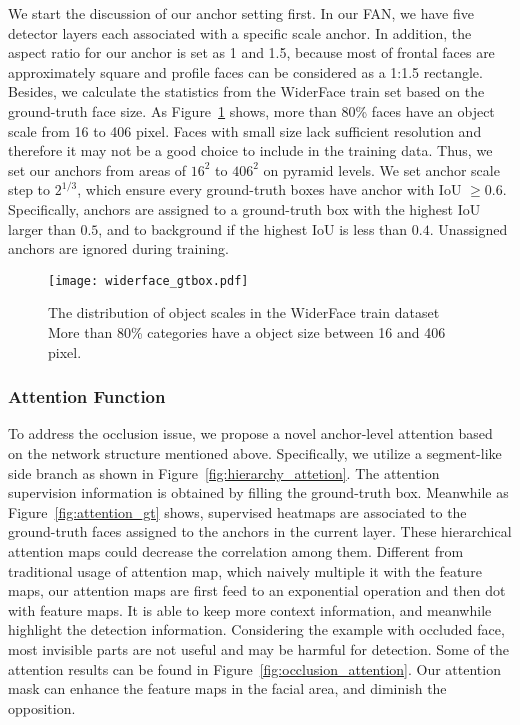 \documentclass[10pt,twocolumn,letterpaper]{article}
\begin{document}
We start the discussion of our anchor setting first. In our FAN, we have five detector layers each associated with a specific scale anchor. In addition, the aspect ratio for our anchor is set as 1 and 1.5, because most of frontal faces are approximately square and profile faces can be considered as a 1:1.5 rectangle. Besides, we calculate the statistics from the WiderFace train set based on the ground-truth face size. As Figure~\ref{fig:widerface} shows, more than 80\% faces have an object scale from 16 to 406 pixel. Faces with small size lack sufficient resolution and therefore it may not be a good choice to include in the training data. Thus, we set our anchors from areas of $ 16^2 $ to $ 406^2 $ on pyramid levels. We set anchor scale step to $ 2 ^ {1/3} $, which ensure every ground-truth boxes have anchor with IoU $ \geq 0.6 $. Specifically, anchors are assigned to a ground-truth box with the highest IoU larger than $0.5$, and to background if the highest IoU is less than $0.4$. Unassigned anchors are ignored during training.

\begin{figure}[h]
\begin{center}
    \texttt{[image: widerface\_gtbox.pdf]}
\end{center}
    \caption{The distribution of object scales in the WiderFace train dataset More than 80\% categories have a object
size between 16 and 406 pixel.}
\label{fig:widerface}
\end{figure}




\subsubsection{Attention Function\label{sec:attention func}}

To address the occlusion issue, we propose a novel anchor-level attention based on the network structure mentioned above. Specifically, we utilize a segment-like side branch as shown in Figure~\ref{fig:hierarchy_attetion}. The attention supervision information is obtained by filling the ground-truth box. Meanwhile as Figure~\ref{fig:attention_gt} shows, supervised heatmaps are associated to the ground-truth faces assigned to the anchors in the current layer. These hierarchical attention maps could decrease the correlation among them. Different from traditional usage of attention map, which naively multiple it with the feature maps, our attention maps are first feed to an exponential operation and then dot with feature maps. It is able to keep more context information, and meanwhile highlight the detection information. Considering the example with occluded face, most invisible parts are not useful and may be harmful for detection. Some of the attention results can be found in Figure~\ref{fig:occlusion_attention}. Our attention mask can enhance the feature maps in the facial area, and diminish the opposition.
\end{document}
